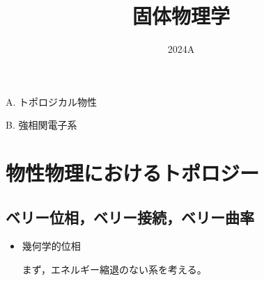 \documentclass[a4paper,11pt,dvipdfmx]{jsarticle}
\title{固体物理学\Rnum{3}}
\author{}
\date{2024A}
\theoremstyle{definition}%
\numberwithin{equation}{section}%
\numberwithin{theorem}{section} %
\begin{document}
\maketitle


A. トポロジカル物性

B. 強相関電子系

\section{物性物理におけるトポロジー}
\subsection{ベリー位相，ベリー接続，ベリー曲率}
\begin{itemize}
  \item 幾何学的位相
  
  まず，エネルギー縮退のない系を考える。


\end{itemize}
\end{document}
